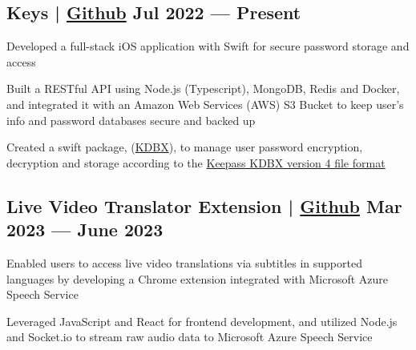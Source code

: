 \subsection{{Keys | \href{https://github.com/jerikjakobsen/keys}{Github} \hfill Jul 2022 --- Present}}
\begin{zitemize}
\item Developed a full-stack iOS application with Swift for secure password storage and access
\item Built a RESTful API using Node.js (Typescript), MongoDB, Redis and Docker, and integrated it with an Amazon Web Services (AWS) S3 Bucket to keep user's info and password databases secure and backed up
\item Created a swift package, (\href{https://github.com/jerikjakobsen/kdbx}{KDBX}), to manage user password encryption, decryption and storage according to the  \href{https://keepass.info/help/kb/kdbx_4.html}{Keepass KDBX version 4 file format}
\end{zitemize}


\subsection{{Live Video Translator Extension | \href{https://github.com/jerikjakobsen/Translator-Extension}{Github} \hfill Mar 2023 --- June 2023}}
\begin{zitemize}
\item Enabled users to access live video translations via subtitles in supported languages by developing a Chrome extension integrated with Microsoft Azure Speech Service
\item Leveraged JavaScript and React for frontend development, and utilized Node.js and Socket.io to stream raw audio data to Microsoft Azure Speech Service
\end{zitemize}